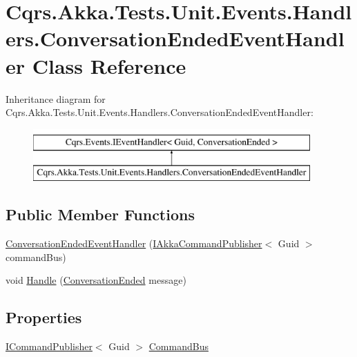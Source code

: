 \hypertarget{classCqrs_1_1Akka_1_1Tests_1_1Unit_1_1Events_1_1Handlers_1_1ConversationEndedEventHandler}{}\section{Cqrs.\+Akka.\+Tests.\+Unit.\+Events.\+Handlers.\+Conversation\+Ended\+Event\+Handler Class Reference}
\label{classCqrs_1_1Akka_1_1Tests_1_1Unit_1_1Events_1_1Handlers_1_1ConversationEndedEventHandler}
Inheritance diagram for Cqrs.\+Akka.\+Tests.\+Unit.\+Events.\+Handlers.\+Conversation\+Ended\+Event\+Handler\+:\begin{figure}[H]
\begin{center}
\leavevmode
\includegraphics[height=2.000000cm]{classCqrs_1_1Akka_1_1Tests_1_1Unit_1_1Events_1_1Handlers_1_1ConversationEndedEventHandler}
\end{center}
\end{figure}
\subsection*{Public Member Functions}
\begin{DoxyCompactItemize}
\item 
\hyperlink{classCqrs_1_1Akka_1_1Tests_1_1Unit_1_1Events_1_1Handlers_1_1ConversationEndedEventHandler_a4e335a0e004613251aafed4230ba33cd_a4e335a0e004613251aafed4230ba33cd}{Conversation\+Ended\+Event\+Handler} (\hyperlink{interfaceCqrs_1_1Akka_1_1Commands_1_1IAkkaCommandPublisher}{I\+Akka\+Command\+Publisher}$<$ Guid $>$ command\+Bus)
\item 
void \hyperlink{classCqrs_1_1Akka_1_1Tests_1_1Unit_1_1Events_1_1Handlers_1_1ConversationEndedEventHandler_a1e363c715cefdb600705d7b3f5e3bca6_a1e363c715cefdb600705d7b3f5e3bca6}{Handle} (\hyperlink{classCqrs_1_1Akka_1_1Tests_1_1Unit_1_1Events_1_1ConversationEnded}{Conversation\+Ended} message)
\end{DoxyCompactItemize}
\subsection*{Properties}
\begin{DoxyCompactItemize}
\item 
\hyperlink{interfaceCqrs_1_1Commands_1_1ICommandPublisher}{I\+Command\+Publisher}$<$ Guid $>$ \hyperlink{classCqrs_1_1Akka_1_1Tests_1_1Unit_1_1Events_1_1Handlers_1_1ConversationEndedEventHandler_a2ad947f0ed860a416ba8a0795caa06d1_a2ad947f0ed860a416ba8a0795caa06d1}{Command\+Bus}
\end{DoxyCompactItemize}


